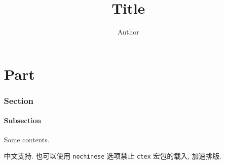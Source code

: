 \documentclass[english]{note}
\title{Title}
\author{Author}
\begin{document}
\maketitle

\tableofcontents





\part{Part}

\section{Section}

\subsection{Subsection}

Some contents. \parencite{Bibtexkey}

中文支持. 也可以使用 \verb"nochinese" 选项禁止 \verb"ctex" 宏包的载入, 加速排版.

\printbibliography[heading=bibintoc]
\end{document}
